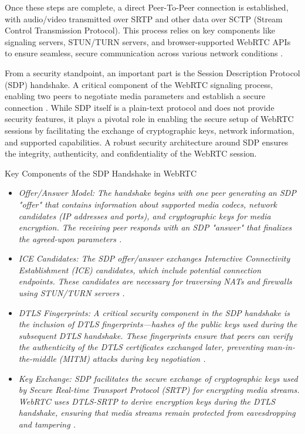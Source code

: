 \documentclass[conference]{IEEEtran}
\begin{document}
Once these steps are complete, a direct Peer-To-Peer connection is established, with audio/video transmitted over SRTP 
and other data over SCTP (Stream Control Transmission Protocol). This process relies on key components like signaling servers, STUN/TURN servers, and browser-supported 
WebRTC APIs to ensure seamless, secure communication across various network conditions \cite{W3C_WebRTC}. 

From a security standpoint, an important part is the Session Description Protocol (SDP) handshake. A critical component of the WebRTC signaling process, 
enabling two peers to negotiate media parameters and establish a secure connection \cite{RFC8827}. While SDP itself is a plain-text protocol 
and does not provide security features, it plays a pivotal role in enabling the secure setup of WebRTC sessions by facilitating the exchange 
of cryptographic keys, network information, and supported capabilities. A robust security architecture around SDP ensures the integrity, 
authenticity, and confidentiality of the WebRTC session.

Key Components of the SDP Handshake in WebRTC
\begin{itemize}
    \item \it{Offer/Answer Model:} The handshake begins with one peer generating an SDP "offer" that contains information about supported media codecs, network candidates 
    (IP addresses and ports), and cryptographic keys for media encryption. The receiving peer responds with an SDP "answer" that finalizes 
    the agreed-upon parameters \cite{RFC3264}.
    \item \it{ICE Candidates:} The SDP offer/answer exchanges Interactive Connectivity Establishment (ICE) candidates, which include potential connection 
    endpoints. These candidates are necessary for traversing NATs and firewalls using STUN/TURN servers \cite{RFC3264}.
    \item \it{DTLS Fingerprints:} A critical security component in the SDP handshake is the inclusion of DTLS fingerprints—hashes of the public keys used during
    the subsequent DTLS handshake. These fingerprints ensure that peers can verify the authenticity of the DTLS certificates exchanged 
    later, preventing man-in-the-middle (MITM) attacks during key negotiation \cite{RFC3264}.
    \item \it{Key Exchange:} SDP facilitates the secure exchange of cryptographic keys used by Secure Real-time Transport Protocol (SRTP) for encrypting 
    media streams. WebRTC uses DTLS-SRTP to derive encryption keys during the DTLS handshake, ensuring that media streams remain 
    protected from eavesdropping and tampering \cite{RFC3264}.
\end{itemize}
\end{document}
